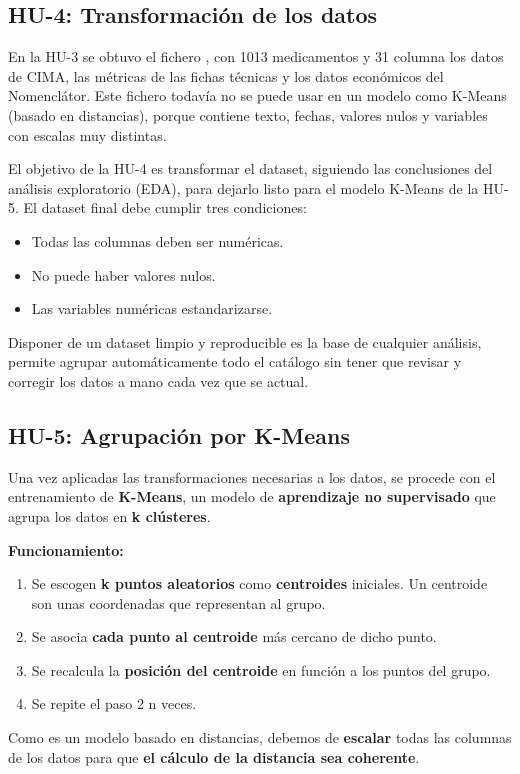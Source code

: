 \documentclass[11pt,a4paper]{article}
\begin{document}
\subsection{HU-4: Transformación de los datos}
En la HU-3 se obtuvo el fichero , con 1013 medicamentos y 31
columna los datos de CIMA, las métricas de las fichas técnicas y los datos
económicos del Nomenclátor. Este fichero todavía no se puede usar en un modelo como K-Means (basado en distancias), porque contiene texto, fechas, valores nulos y variables con escalas muy distintas.

El objetivo de la HU-4 es transformar el dataset, siguiendo las conclusiones del análisis
exploratorio (EDA), para dejarlo listo para el modelo K-Means de la HU-5. El dataset final debe cumplir tres
condiciones:
\begin{itemize}
  \item Todas las columnas deben ser numéricas.
  \item No puede haber valores nulos.
  \item Las variables numéricas estandarizarse.
\end{itemize}
Disponer de un dataset limpio y reproducible es la base de cualquier análisis, permite agrupar automáticamente todo el catálogo sin tener que revisar y corregir los
datos a mano cada vez que se actual.

\subsection{HU-5: Agrupación por K-Means}
Una vez aplicadas las transformaciones necesarias a los datos, se procede con el entrenamiento
de \textbf{K-Means}, un modelo de \textbf{aprendizaje no supervisado} que agrupa los datos en
\textbf{k clústeres}.

\textbf{Funcionamiento:}
\begin{enumerate}
  \item Se escogen \textbf{k puntos aleatorios} como \textbf{centroides} iniciales. Un centroide son unas coordenadas que representan al grupo.
  \item Se asocia \textbf{cada punto al centroide} más cercano de dicho punto.
  \item Se recalcula la \textbf{posición del centroide} en función a los puntos del grupo.
  \item Se repite el paso 2 n veces.
\end{enumerate}
Como es un modelo basado en distancias, debemos de \textbf{escalar} todas las columnas de los datos
para que \textbf{el cálculo de la distancia sea coherente}.
\end{document}
